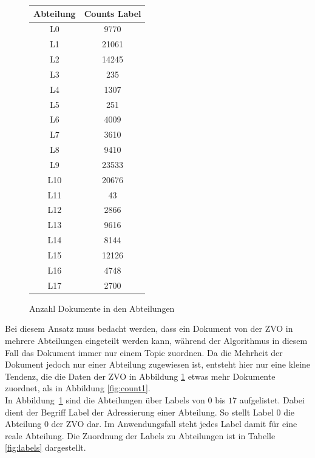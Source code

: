 \documentclass[german,version-2020-11]{uzl-thesis}
\begin{document}
\begin{itemize}
\begin{enumerate}
\begin{figure}[H]
\begin{center}
\begin{tabular}{cc}
\hline
\hline
Abteilung & Counts Label\\
\hline
L0&9770\\
L1&21061\\
L2&14245\\
L3&235\\
L4&1307\\
L5&251\\
L6&4009\\
L7&3610\\
L8&9410\\
L9&23533\\
L10&20676\\
L11&43\\
L12&2866\\
L13&9616\\
L14&8144\\
L15&12126\\
L16&4748\\
L17&2700\\
\hline
\hline
\end{tabular}
\caption{Anzahl Dokumente in den Abteilungen}
\label{fig:count2}
\end{center}
\end{figure}

Bei diesem Ansatz muss bedacht werden, dass ein Dokument von der ZVO in mehrere Abteilungen eingeteilt werden kann, während der Algorithmus in diesem Fall das Dokument immer nur einem Topic zuordnen. Da die Mehrheit der Dokument jedoch nur einer Abteilung zugewiesen ist, entsteht hier nur eine kleine Tendenz, die die Daten der ZVO in Abbildung \ref{fig:count2} etwas mehr Dokumente zuordnet, als in Abbildung \ref{fig:count1}.\\

In Abbildung \ref{fig:count2} sind die Abteilungen über Labels von $0$ bis $17$ aufgelistet. Dabei dient der Begriff Label der Adressierung einer Abteilung. So stellt Label 0 die Abteilung 0 der ZVO dar. Im Anwendungsfall steht jedes Label damit für eine reale Abteilung. Die Zuordnung der Labels zu Abteilungen ist in Tabelle \ref{fig:labels} dargestellt.



\end{enumerate}
\end{itemize}
\end{document}
